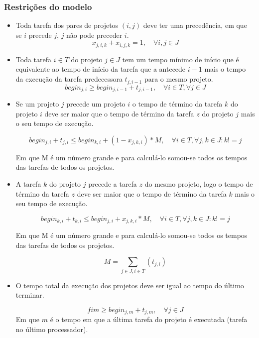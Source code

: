 \documentclass[11pt,letterpaper]{article}
\begin{document}
\subsubsection*{Restrições do modelo}
\begin{itemize}
\item Toda tarefa dos pares de projetos $(i,j)$ deve ter uma precedência, em que se $i$
  precede $j$, $j$ não pode preceder $i$. 
  \begin{equation*}
    x_{j,i,k}+x_{i,j,k}=1, \quad \forall i,j \in J
  \end{equation*}

\item Toda tarefa $i \in T$ do projeto  $j \in J$ tem um tempo mínimo de início que é equivalente ao tempo de início da tarefa que a antecede $i -1$ mais o tempo da execução da tarefa predecessora $ t_{j,i-1}$ para o mesmo projeto. 
  \begin{equation*}
    begin_{j,i} \geq begin_{j,i-1}+ t_{j,i-1}, \quad\forall i \in T, \forall j \in J
  \end{equation*}

\item Se um projeto $j$ precede um projeto $i$ o tempo de término da
  tarefa $k$ do projeto $i$ deve ser maior que o tempo de término da
  tarefa $z$ do projeto $j$ mais o seu tempo de execução.
  
  \begin{equation*}
    begin_{j,i} + t_{j,i} \leq begin_{k,i}+(1-x_{j,k,i})*M,\quad \forall i \in T, \forall j,k \in J  : k!=j 
  \end{equation*}


  Em que M é um número grande e para calculá-lo somou-se todos os tempos
  das tarefas de todos os projetos. 

\item A tarefa $k$ do projeto $j$ precede a tarefa $z$ do mesmo
  projeto, logo o tempo de término da
  tarefa $z$ deve ser maior que o tempo de término da
  tarefa $k$ mais o seu tempo de execução.
  
  \begin{equation*}
    begin_{k,i} + t_{k,i} \leq begin_{j,i}+x_{j,k,i}*M,\quad \forall i \in T , \forall j,k \in J : k!=j 
  \end{equation*}

  Em que M é um número grande e para calculá-lo somou-se todos os tempos
  das tarefas de todos os projetos. 


  \begin{equation*}
    M = \sum_{j \in J,i \in T} (t_{j,i}) 
  \end{equation*}

\item O tempo total da execução dos projetos deve ser igual ao tempo
  do último terminar.
  
  \begin{equation*}
    fim \geq begin_{j,m}+ t_{j,m},\quad \forall j \in J
  \end{equation*}
  Em que $m$ é o tempo em que a última tarefa do projeto é executada
  (tarefa no último processador).
\end{itemize}
\end{document}
